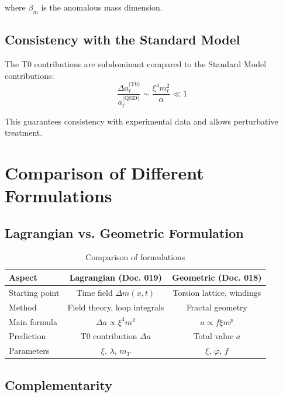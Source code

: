 	where $\beta_m$ is the anomalous mass dimension.
	
	\subsection{Consistency with the Standard Model}
	
	The T0 contributions are subdominant compared to the Standard Model contributions:
	\begin{equation}
		\frac{\Delta a_\ell^{\text{(T0)}}}{a_\ell^{\text{(QED)}}} \sim \frac{\xi^4 m_\ell^2}{\alpha} \ll 1
		\label{eq:hierarchy}
	\end{equation}
	
	This guarantees consistency with experimental data and allows perturbative treatment.
	
	\section{Comparison of Different Formulations}
	
	\subsection{Lagrangian vs. Geometric Formulation}
	
	\begin{table}[h]
		\centering
		\begin{tabular}{lcc}
			\toprule
			\textbf{Aspect} & \textbf{Lagrangian (Doc. 019)} & \textbf{Geometric (Doc. 018)} \\
			\midrule
			Starting point & Time field $\Delta m(x,t)$ & Torsion lattice, windings \\
			Method & Field theory, loop integrals & Fractal geometry \\
			Main formula & $\Delta a \propto \xi^4 m^2$ & $a \propto f \xi m^{p}$ \\
			Prediction & T0 contribution $\Delta a$ & Total value $a$ \\
			Parameters & $\xi$, $\lambda$, $m_T$ & $\xi$, $\varphi$, $f$ \\
			\bottomrule
		\end{tabular}
		\caption{Comparison of formulations}
		\label{tab:comparison}
	\end{table}
	
	\subsection{Complementarity}
	
